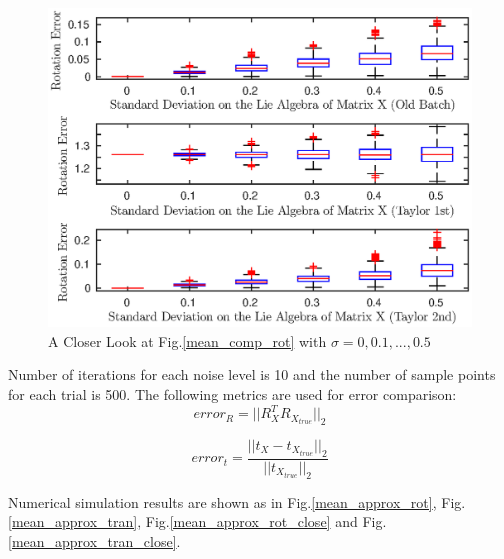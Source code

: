 \documentclass[twocolumn,10pt]{asme2ej}
\begin{document}
\begin{figure}[h]
\includegraphics[scale = 0.60]{Mean_Definition_Figures/mean_rot_abs_5.eps}
\caption{A Closer Look at Fig.\ref{mean_comp_rot} with $\sigma = 0, 0.1, ..., 0.5$ }
\centering
\end{figure}

Number of iterations for each noise level is 10 and the number of sample points for each trial is 500. The following metrics are used for error comparison:
\begin{equation}
error_R = || R_X^{T} R_{X_{true}} ||_2
\end{equation}

\begin{equation}
error_t = \dfrac{||t_X - t_{X_{true}} ||_2 }{|| t_{X_{true}}||_2}
\end{equation}

Numerical simulation results are shown as in Fig.\ref{mean_approx_rot}, Fig.\ref{mean_approx_tran}, Fig.\ref{mean_approx_rot_close} and Fig.\ref{mean_approx_tran_close}.
\end{document}
